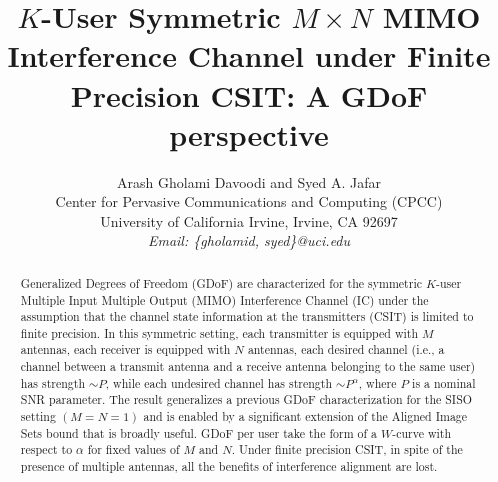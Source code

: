 \documentclass[11pt]{article}
\begin{document}
\date{}
\title{$K$-User Symmetric $M\times N$ MIMO Interference Channel under Finite Precision CSIT: A GDoF perspective}
\author{ \normalsize Arash Gholami Davoodi and Syed A. Jafar \\
{\small Center for Pervasive Communications and Computing (CPCC)}\\
{\small University of California Irvine, Irvine, CA 92697}\\
{\small \it Email: \{gholamid, syed\}@uci.edu}
}
\maketitle




 
\begin{abstract}
Generalized Degrees of Freedom (GDoF) are characterized for the symmetric $K$-user Multiple Input Multiple Output (MIMO) Interference Channel (IC) under the assumption that the channel state information at the transmitters (CSIT) is limited to finite precision. In this symmetric setting, each transmitter is equipped with $M$ antennas, each receiver is equipped with $N$ antennas, each desired channel (i.e., a channel between a transmit antenna and a receive antenna belonging to the same user) has strength $\sim P$, while each undesired channel has strength $\sim P^\alpha$, where $P$ is a nominal SNR parameter.  The result generalizes a previous GDoF characterization for the SISO setting $(M=N=1)$ and is enabled by a significant extension of the Aligned Image Sets bound that is broadly useful. GDoF per user take the form of a $W$-curve with respect to $\alpha$ for fixed values of $M$ and $N$. Under finite precision CSIT, in spite of the presence of multiple antennas, all the benefits of  interference alignment are lost.
\end{abstract}
\end{document}
